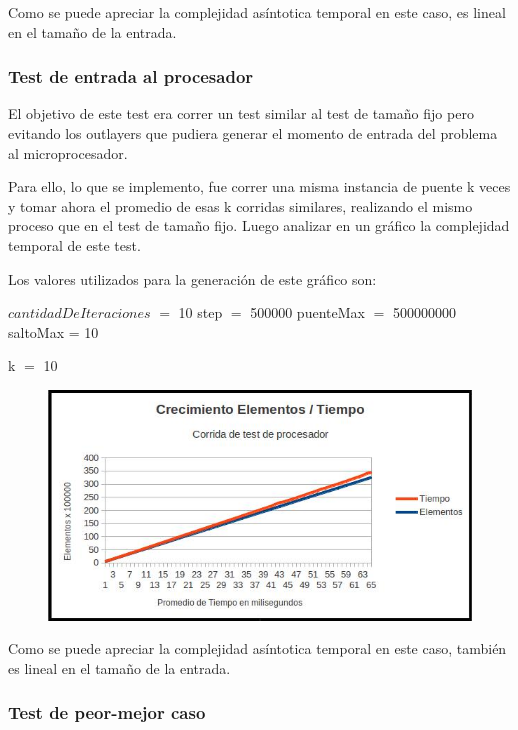 Como se puede apreciar la complejidad as\'intotica temporal en este caso, es lineal en el tamaño de la entrada.


\newpage
\subsubsection{Test de entrada al procesador}

El objetivo de este test era correr un test similar al test de tamaño fijo pero evitando los outlayers que pudiera generar el momento de entrada del problema al microprocesador. 

Para ello, lo que se implemento, fue correr una misma instancia de puente k veces y tomar ahora el promedio de esas k corridas similares, realizando el mismo proceso que en el test de tamaño fijo. Luego analizar en un gr\'afico la complejidad temporal de este test.

Los valores utilizados para la generaci\'on de este gr\'afico son:

$cantidadDeIteraciones$ $=$ 10 step $=$ 500000 puenteMax $=$ 500000000 saltoMax = 10 

k $=$ 10


\begin{figure}[ht]
	\begin{minipage}[t]{\linewidth}
		\centering
		\includegraphics[width=\textwidth]{grafico_de_entrada_al_procesador.jpg}
	\end{minipage}	
\end{figure}

Como se puede apreciar la complejidad as\'intotica temporal en este caso, tambi\'en es lineal en el tamaño de la entrada.


\subsubsection{Test de peor-mejor caso}


